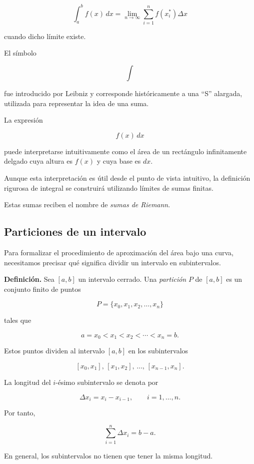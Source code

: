 \documentclass[12pt]{article}
\begin{document}
\[
\boxed{
\int_a^b f(x)\,dx
=
\lim_{n\to\infty}
\sum_{i=1}^{n}
f(x_i^*)\Delta x
}
\]

cuando dicho límite existe.

El símbolo

\[
\int
\]

fue introducido por Leibniz y corresponde históricamente a una
``S'' alargada, utilizada para representar la idea de una suma.

La expresión

\[
f(x)\,dx
\]

puede interpretarse intuitivamente como el área de un rectángulo
infinitamente delgado cuya altura es $f(x)$ y cuya base es $dx$.

Aunque esta interpretación es útil desde el punto de vista intuitivo,
la definición rigurosa de integral se construirá utilizando límites
de sumas finitas.

Estas sumas reciben el nombre de \emph{sumas de Riemann}.

\subsection{Particiones de un intervalo}

Para formalizar el procedimiento de aproximación del área bajo una curva,
necesitamos precisar qué significa dividir un intervalo en subintervalos.

\textbf{Definición.}
Sea $[a,b]$ un intervalo cerrado. Una \emph{partición} $P$ de $[a,b]$
es un conjunto finito de puntos

\[
P=\{x_0,x_1,x_2,\ldots,x_n\}
\]

tales que

\[
a=x_0<x_1<x_2<\cdots<x_n=b.
\]

Estos puntos dividen al intervalo $[a,b]$ en los subintervalos

\[
[x_0,x_1],\,
[x_1,x_2],\,
\ldots,\,
[x_{n-1},x_n].
\]

La longitud del $i$-ésimo subintervalo se denota por

\[
\Delta x_i=x_i-x_{i-1},
\qquad i=1,\ldots,n.
\]

Por tanto,

\[
\sum_{i=1}^{n}\Delta x_i=b-a.
\]

En general, los subintervalos no tienen que tener la misma longitud.

\end{document}
